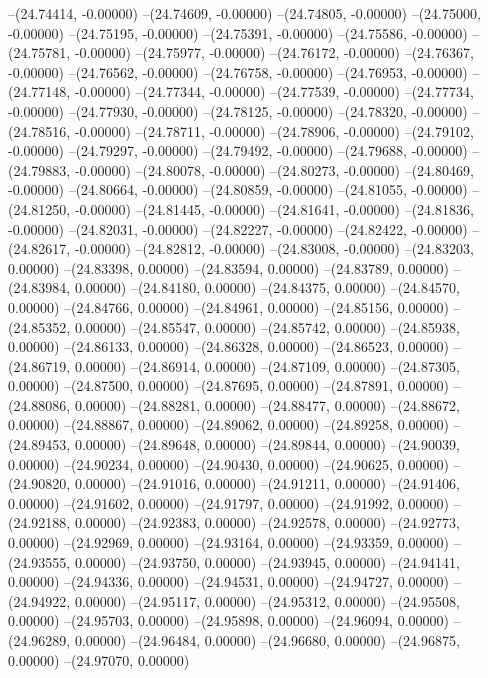 --(24.74414, -0.00000)
--(24.74609, -0.00000)
--(24.74805, -0.00000)
--(24.75000, -0.00000)
--(24.75195, -0.00000)
--(24.75391, -0.00000)
--(24.75586, -0.00000)
--(24.75781, -0.00000)
--(24.75977, -0.00000)
--(24.76172, -0.00000)
--(24.76367, -0.00000)
--(24.76562, -0.00000)
--(24.76758, -0.00000)
--(24.76953, -0.00000)
--(24.77148, -0.00000)
--(24.77344, -0.00000)
--(24.77539, -0.00000)
--(24.77734, -0.00000)
--(24.77930, -0.00000)
--(24.78125, -0.00000)
--(24.78320, -0.00000)
--(24.78516, -0.00000)
--(24.78711, -0.00000)
--(24.78906, -0.00000)
--(24.79102, -0.00000)
--(24.79297, -0.00000)
--(24.79492, -0.00000)
--(24.79688, -0.00000)
--(24.79883, -0.00000)
--(24.80078, -0.00000)
--(24.80273, -0.00000)
--(24.80469, -0.00000)
--(24.80664, -0.00000)
--(24.80859, -0.00000)
--(24.81055, -0.00000)
--(24.81250, -0.00000)
--(24.81445, -0.00000)
--(24.81641, -0.00000)
--(24.81836, -0.00000)
--(24.82031, -0.00000)
--(24.82227, -0.00000)
--(24.82422, -0.00000)
--(24.82617, -0.00000)
--(24.82812, -0.00000)
--(24.83008, -0.00000)
--(24.83203, 0.00000)
--(24.83398, 0.00000)
--(24.83594, 0.00000)
--(24.83789, 0.00000)
--(24.83984, 0.00000)
--(24.84180, 0.00000)
--(24.84375, 0.00000)
--(24.84570, 0.00000)
--(24.84766, 0.00000)
--(24.84961, 0.00000)
--(24.85156, 0.00000)
--(24.85352, 0.00000)
--(24.85547, 0.00000)
--(24.85742, 0.00000)
--(24.85938, 0.00000)
--(24.86133, 0.00000)
--(24.86328, 0.00000)
--(24.86523, 0.00000)
--(24.86719, 0.00000)
--(24.86914, 0.00000)
--(24.87109, 0.00000)
--(24.87305, 0.00000)
--(24.87500, 0.00000)
--(24.87695, 0.00000)
--(24.87891, 0.00000)
--(24.88086, 0.00000)
--(24.88281, 0.00000)
--(24.88477, 0.00000)
--(24.88672, 0.00000)
--(24.88867, 0.00000)
--(24.89062, 0.00000)
--(24.89258, 0.00000)
--(24.89453, 0.00000)
--(24.89648, 0.00000)
--(24.89844, 0.00000)
--(24.90039, 0.00000)
--(24.90234, 0.00000)
--(24.90430, 0.00000)
--(24.90625, 0.00000)
--(24.90820, 0.00000)
--(24.91016, 0.00000)
--(24.91211, 0.00000)
--(24.91406, 0.00000)
--(24.91602, 0.00000)
--(24.91797, 0.00000)
--(24.91992, 0.00000)
--(24.92188, 0.00000)
--(24.92383, 0.00000)
--(24.92578, 0.00000)
--(24.92773, 0.00000)
--(24.92969, 0.00000)
--(24.93164, 0.00000)
--(24.93359, 0.00000)
--(24.93555, 0.00000)
--(24.93750, 0.00000)
--(24.93945, 0.00000)
--(24.94141, 0.00000)
--(24.94336, 0.00000)
--(24.94531, 0.00000)
--(24.94727, 0.00000)
--(24.94922, 0.00000)
--(24.95117, 0.00000)
--(24.95312, 0.00000)
--(24.95508, 0.00000)
--(24.95703, 0.00000)
--(24.95898, 0.00000)
--(24.96094, 0.00000)
--(24.96289, 0.00000)
--(24.96484, 0.00000)
--(24.96680, 0.00000)
--(24.96875, 0.00000)
--(24.97070, 0.00000)
